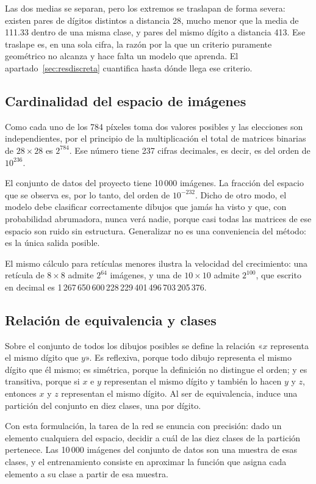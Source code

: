 \documentclass[12pt,letterpaper]{article}
\begin{document}
Las dos medias se separan, pero los extremos se traslapan de forma severa: existen
pares de dígitos distintos a distancia 28, mucho menor que la media de 111.33
dentro de una misma clase, y pares del mismo dígito a distancia 413. Ese traslape
es, en una sola cifra, la razón por la que un criterio puramente geométrico no
alcanza y hace falta un modelo que aprenda. El apartado~\ref{sec:resdiscreta}
cuantifica hasta dónde llega ese criterio.

\subsection{Cardinalidad del espacio de imágenes}

Como cada uno de los 784 píxeles toma dos valores posibles y las elecciones son
independientes, por el principio de la multiplicación el total de matrices
binarias de $28\times28$ es $2^{784}$. Ese número tiene 237 cifras decimales, es
decir, es del orden de $10^{236}$.

El conjunto de datos del proyecto tiene 10\,000 imágenes. La fracción del espacio
que se observa es, por lo tanto, del orden de $10^{-232}$. Dicho de otro modo, el
modelo debe clasificar correctamente dibujos que jamás ha visto y que, con
probabilidad abrumadora, nunca verá nadie, porque casi todas las matrices de ese
espacio son ruido sin estructura. Generalizar no es una conveniencia del método:
es la única salida posible.

El mismo cálculo para retículas menores ilustra la velocidad del crecimiento: una
retícula de $8\times8$ admite $2^{64}$ imágenes, y una de $10\times10$ admite
$2^{100}$, que escrito en decimal es
1\,267\,650\,600\,228\,229\,401\,496\,703\,205\,376.

\subsection{Relación de equivalencia y clases}

Sobre el conjunto de todos los dibujos posibles se define la relación «$x$
representa el mismo dígito que $y$». Es reflexiva, porque todo dibujo representa el
mismo dígito que él mismo; es simétrica, porque la definición no distingue el
orden; y es transitiva, porque si $x$ e $y$ representan el mismo dígito y también
lo hacen $y$ y $z$, entonces $x$ y $z$ representan el mismo dígito. Al ser de
equivalencia, induce una partición del conjunto en diez clases, una por dígito.

Con esta formulación, la tarea de la red se enuncia con precisión: dado un
elemento cualquiera del espacio, decidir a cuál de las diez clases de la partición
pertenece. Las 10\,000 imágenes del conjunto de datos son una muestra de esas
clases, y el entrenamiento consiste en aproximar la función que asigna cada
elemento a su clase a partir de esa muestra.
\end{document}
